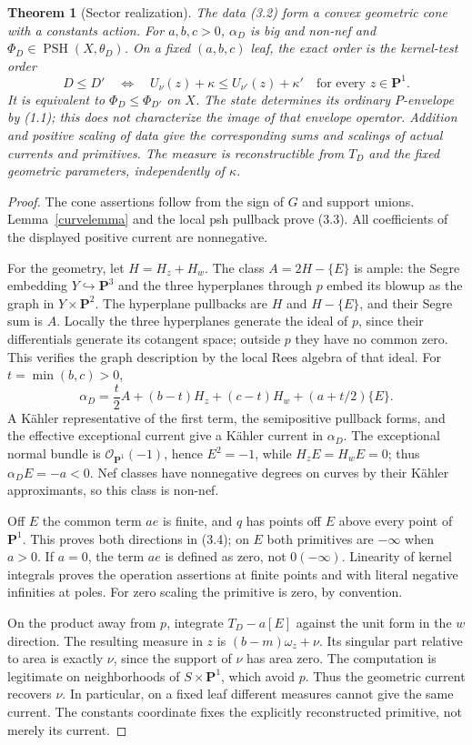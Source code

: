 \documentclass[11pt]{article}
\newtheorem{theorem}{Theorem}[section]
\theoremstyle{remark}\newtheorem{remark}[theorem]{Remark}
\newcommand{\PSH}{\operatorname{PSH}}
\newcommand{\PP}{\mathbf P^1}
\begin{document}
\begin{theorem}[Sector realization]\label{sectorthm}
The data (3.2) form a convex geometric cone with a constants action.
For $a,b,c>0$, $\alpha_D$ is big and non-nef and
$\Phi_D\in\PSH(X,\theta_D)$.
On a fixed $(a,b,c)$ leaf, the exact order is the kernel-test order
\[
 D\leq D'\quad\Longleftrightarrow\quad
 U_\nu(z)+\kappa\leq U_{\nu'}(z)+\kappa'
 \quad\text{for every }z\in\PP.
 \tag{3.4}
\]
It is equivalent to $\Phi_D\leq\Phi_{D'}$ on $X$.
The state determines its ordinary $P$-envelope by (1.1);
this does not characterize the image of that envelope operator.
Addition and positive scaling of data give the corresponding sums
and scalings of actual currents and primitives.
The measure is reconstructible from $T_D$ and the fixed geometric
parameters, independently of $\kappa$.
\end{theorem}
\begin{proof}
The cone assertions follow from the sign of $G$ and support unions.
Lemma~\ref{curvelemma} and the local psh pullback prove (3.3).
All coefficients of the displayed positive current are nonnegative.

For the geometry, let $H=H_z+H_w$.
The class $A=2H-\{E\}$ is ample: the Segre embedding
$Y\hookrightarrow\mathbf P^3$ and the three hyperplanes through $p$
embed its blowup as the graph in $Y\times\mathbf P^2$.
The hyperplane pullbacks are $H$ and $H-\{E\}$, and their
Segre sum is $A$. Locally the three hyperplanes generate the
ideal of $p$, since their differentials generate its cotangent space;
outside $p$ they have no common zero. This verifies the graph
description by the local Rees algebra of that ideal.
For $t=\min(b,c)>0$,
\[
 \alpha_D=\frac t2 A+(b-t)H_z+(c-t)H_w+
                 (a+t/2)\{E\}.
 \tag{3.5}
\]
A K\"ahler representative of the first term, the semipositive
pullback forms, and the effective exceptional current give a
K\"ahler current in $\alpha_D$.
The exceptional normal bundle is $\mathcal O_{\PP}(-1)$, hence
$E^2=-1$, while $H_zE=H_wE=0$; thus $\alpha_DE=-a<0$.
Nef classes have nonnegative degrees on curves by their
K\"ahler approximants, so this class is non-nef.

Off $E$ the common term $ae$ is finite, and $q$ has points off $E$
above every point of $\PP$. This proves both directions in (3.4);
on $E$ both primitives are $-\infty$ when $a>0$.
If $a=0$, the term $ae$ is defined as zero, not $0(-\infty)$.
Linearity of kernel integrals proves the operation assertions
at finite points and with literal negative infinities at poles.
For zero scaling the primitive is zero, by convention.

On the product away from $p$, integrate $T_D-a[E]$ against
the unit form in the $w$ direction. The resulting measure in $z$
is $(b-m)\omega_z+\nu$.
Its singular part relative to area is exactly $\nu$, since the
support of $\nu$ has area zero. The computation is legitimate
on neighborhoods of $S\times\PP$, which avoid $p$.
Thus the geometric current recovers $\nu$.
In particular, on a fixed leaf different measures cannot give
the same current. The constants coordinate fixes the explicitly
reconstructed primitive, not merely its current.
\end{proof}
\end{document}
